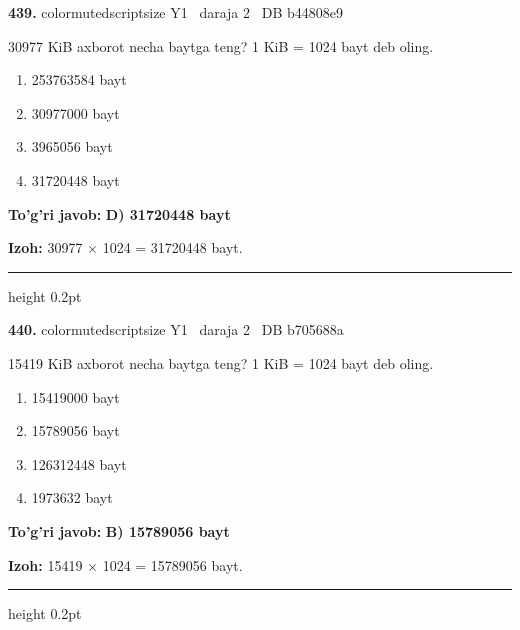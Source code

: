 \documentclass[10pt,a4paper,oneside]{article}
\begin{document}
\noindent\textbf{\color{ink}439.}  {color{muted}scriptsize Y1 \textbullet\ daraja 2 \textbullet\ DB b44808e9}
\par
30977 KiB axborot necha baytga teng? 1 KiB = 1024 bayt deb oling.
\begin{enumerate}[label=\Alph*),leftmargin=9mm]
\item 253763584 bayt
\item 30977000 bayt
\item 3965056 bayt
\item 31720448 bayt
\end{enumerate}
\begin{tcolorbox}[enhanced,breakable,colback=teal!4,colframe=teal!50!black,boxrule=0.5pt,arc=1.1mm,left=3mm,right=3mm,top=1.7mm,bottom=1.7mm,before skip=2mm,after skip=2mm]
\textbf{\color{teal}To'g'ri javob:} \textbf{D) 31720448 bayt}
\par\smallskip
\textbf{Izoh:} 30977 \ensuremath{\times} 1024 = 31720448 bayt.
\end{tcolorbox}
\vspace{2mm}\hrule height 0.2pt \vspace{3mm}

\noindent\textbf{\color{ink}440.}  {color{muted}scriptsize Y1 \textbullet\ daraja 2 \textbullet\ DB b705688a}
\par
15419 KiB axborot necha baytga teng? 1 KiB = 1024 bayt deb oling.
\begin{enumerate}[label=\Alph*),leftmargin=9mm]
\item 15419000 bayt
\item 15789056 bayt
\item 126312448 bayt
\item 1973632 bayt
\end{enumerate}
\begin{tcolorbox}[enhanced,breakable,colback=teal!4,colframe=teal!50!black,boxrule=0.5pt,arc=1.1mm,left=3mm,right=3mm,top=1.7mm,bottom=1.7mm,before skip=2mm,after skip=2mm]
\textbf{\color{teal}To'g'ri javob:} \textbf{B) 15789056 bayt}
\par\smallskip
\textbf{Izoh:} 15419 \ensuremath{\times} 1024 = 15789056 bayt.
\end{tcolorbox}
\vspace{2mm}\hrule height 0.2pt \vspace{3mm}
\end{document}
